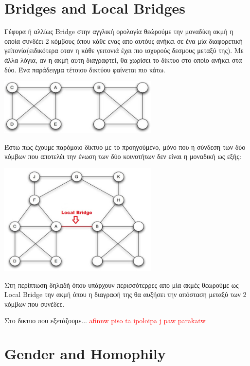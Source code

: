 \documentclass[12pt]{article}
\begin{document}
	
	\newpage
	\section{Bridges and Local Bridges}
	Γέφυρα ή αλλίως Bridge στην αγγλική ορολογία θεώρούμε την μοναδίκη ακμή η οποία συνδέει 2 κόμβους όπου κάθε ενας απο αυτόυς ανήκει σε ένα μία διαφορετική γείτονία(ειδικότερα οταν η κάθε γειτονιά έχει πιο ισχυρούς δεσμους μεταξύ της). Με άλλα λόγια, αν η ακμή αυτη διαγραφτεί, θα χωρίσει το δίκτυο στο οποίο ανήκει στα δύο. Ένα παράδειγμα τέτοιου δικτύου φαίνεται πιο κάτω.
	\begin{center}
		\includegraphics[width=0.6\textwidth]{photos-files/section9/bridge_example.jpg}
	\end{center}
	\vspace{12pt}
	Έστω πως έχουμε παρόμοιο δίκτυο με το προηγούμενο, μόνο που η σύνδεση των δύο κόμβων που αποτελέι την ένωση των δύο κοινοτήτων δεν είναι η μοναδική ως εξής:
	\begin{center}
		\includegraphics[width=0.6\textwidth]{photos-files/section9/local_bridge_example.jpg}
	\end{center}
	\vspace{12pt}
	Στη περίπτωση δηλαδή όπου υπάρχουν περισσότερρες απο μία ακμές θεωρούμε ως Local Bridge την ακμή όπου η διαγραφή της θα αυξήσει την απόσταση μεταξύ των 2 κόμβων που συνέδεε.
	
	\newpage
	Στο δικτυο που εξετάζουμε... \textcolor{red}{afinnw piso ta ipoloipa j paw parakatw}
	\label{chap:bridges_and_local_bridges_9}
	
		
	\newpage
	\section{Gender and Homophily}
	
\end{document}
